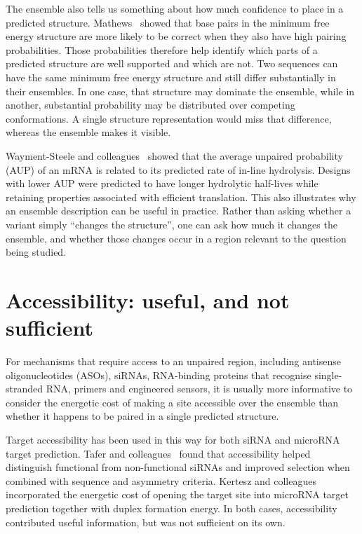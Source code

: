The ensemble also tells us something about how much confidence to place in a
predicted structure. Mathews~\cite{mathews2004} showed that base pairs in the
minimum free energy structure are more likely to be correct when they also
 have high pairing probabilities. Those probabilities therefore help identify
which parts of a predicted structure are well supported and which are not. Two
sequences can have the same minimum free energy structure and still differ
substantially in their ensembles. In one case, that structure may dominate
the ensemble, while in another, substantial probability may be distributed over
competing conformations. A single structure representation would miss that
difference, whereas the ensemble makes it visible.

Wayment-Steele and colleagues~\cite{waymentsteele2021} showed that the
average unpaired probability (AUP) of an mRNA is related to its predicted
rate of in-line hydrolysis. Designs with lower AUP were predicted to have
longer hydrolytic half-lives while retaining properties associated with
efficient translation. This also illustrates why an ensemble description
can be useful in practice. Rather than asking whether a variant simply
``changes the structure'', one can ask how much it changes the ensemble,
and whether those changes occur in a region relevant to the question being studied.


\section{Accessibility: useful, and not sufficient}

For mechanisms that require access to an unpaired region, including antisense
oligonucleotides (ASOs), siRNAs, RNA-binding proteins that recognise
single-stranded RNA, primers and engineered sensors, it is usually more
informative to consider the energetic cost of making a site accessible over
the ensemble than whether it happens to be paired in a single predicted structure.

Target accessibility has been used in this way for both siRNA and microRNA
target prediction. Tafer and colleagues~\cite{tafer2008} found that
accessibility helped distinguish functional from non-functional siRNAs
and improved selection when combined with sequence and asymmetry criteria.
Kertesz and colleagues~\cite{kertesz2007} incorporated the energetic cost
of opening the target site into microRNA target prediction together with
duplex formation energy. In both cases, accessibility contributed useful
information, but was not sufficient on its own.

